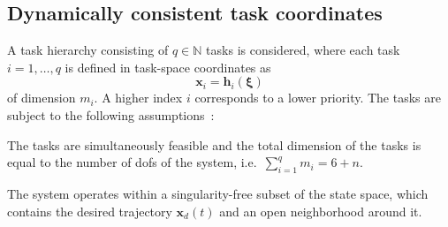\documentclass[../main.tex]{subfiles}
\begin{document}
\subsection{Dynamically consistent task coordinates}




A task hierarchy consisting of $q \in \mathbb{N}$ tasks is considered, where each task $i=1,\ldots,q$ is defined in task-space coordinates as
\begin{equation}
    \bm{x}_i = \bm{h}_i (\bm{\xi})
\end{equation}
of dimension $m_i$. A higher index $i$ corresponds to a lower priority. The tasks are subject to the following assumptions~\cite{Dietrich2020}:
\begin{assumption}\label{ass:tasks:dof}
    The tasks are simultaneously feasible and the total dimension of the tasks is equal to the number  of \glspl{dof} of the system, i.e.~$\sum_{i=1}^{q} m_i = 6+n$.
\end{assumption}
%
\begin{assumption}\label{ass:tasks:nonsingular}
    The system operates within a singularity-free subset of the state space, which contains the desired trajectory $\bm{x}_d(t)$ and an open neighborhood around it.
\end{assumption}
\end{document}
